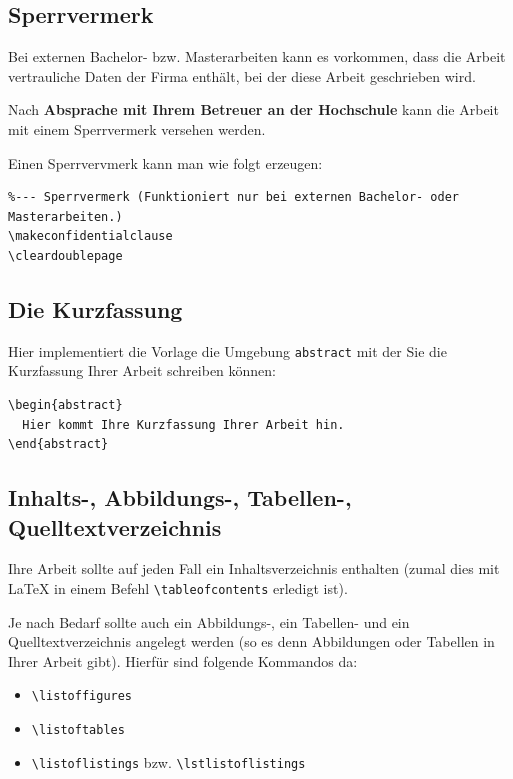 \documentclass[pdftex,a4paper]{scrartcl}
\begin{document}
\subsection{Sperrvermerk}

Bei externen Bachelor- bzw. Masterarbeiten kann es vorkommen, dass die Arbeit
vertrauliche Daten der Firma enthält, bei der diese Arbeit geschrieben wird.

Nach \textbf{Absprache mit Ihrem Betreuer an der Hochschule} kann die Arbeit
mit einem Sperrvermerk versehen werden.


Einen Sperrvervmerk kann man wie folgt erzeugen:

\begin{verbatim}
%--- Sperrvermerk (Funktioniert nur bei externen Bachelor- oder Masterarbeiten.)
\makeconfidentialclause
\cleardoublepage
\end{verbatim}


\subsection{Die Kurzfassung}

Hier implementiert die Vorlage die Umgebung \verb+abstract+ mit der Sie die Kurzfassung Ihrer Arbeit schreiben können:

\begin{verbatim}
\begin{abstract}
  Hier kommt Ihre Kurzfassung Ihrer Arbeit hin.
\end{abstract}
\end{verbatim}


\subsection{Inhalts-, Abbildungs-, Tabellen-, Quelltextverzeichnis}

Ihre Arbeit sollte auf jeden Fall ein Inhaltsverzeichnis enthalten (zumal dies mit
\LaTeX{} in einem Befehl \verb+\tableofcontents+ erledigt ist).

Je nach Bedarf sollte auch ein Abbildungs-, ein Tabellen- und ein Quelltextverzeichnis angelegt werden (so es denn Abbildungen oder Tabellen in Ihrer Arbeit gibt). Hierfür sind folgende Kommandos da:
\begin{itemize}
  \item \verb+\listoffigures+
  \item \verb+\listoftables+
  \item \verb+\listoflistings+ bzw. \verb+\lstlistoflistings+
\end{itemize}
\end{document}
